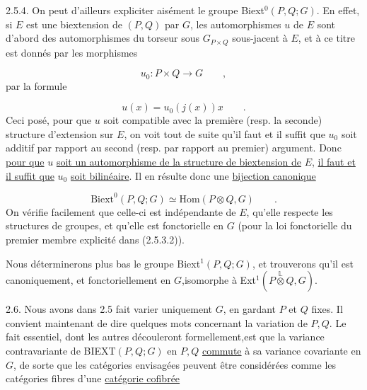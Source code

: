 
2.5.4. On peut d'ailleurs expliciter aisément le groupe Biext$^{0}(P,Q;G)$. En effet, si $E$ est une biextension de $(P,Q)$ par $G$, les automorphismes $u$ de $E$ sont d'abord des automorphismes du torseur sous $G_{P\times Q}$ sous-jacent à $E$, et à ce titre est donnés par les morphismes

\begin{equation*}
u_{0} : P\times Q \longrightarrow G \qquad ,
\end{equation*}
par la formule

\begin{equation*}
u(x) = u_{0}(j(x))x \qquad .
\end{equation*}
Ceci posé, pour que $u$ soit compatible avec la première (resp. la seconde) structure d'extension sur $E$, on voit tout de suite qu'il faut et il suffit que $u_{0}$ soit additif par rapport au second (resp. par rapport au premier) argument. Donc \underline{pour que} $u$ \underline{soit un automorphisme de la structure de biextension de} $E$, \underline{il faut et il suffit que} $u_{0}$ \underline{soit bilinéaire}. Il en résulte donc une \underline{bijection canonique}

\begin{equation}\tag{2.5.4.1}
\mathrm{Biext}^{0}(P,Q;G) \simeq \mathrm{Hom}(P\otimes Q,G) \qquad .
\end{equation}
On vérifie facilement que celle-ci est indépendante de $E$, qu'elle respecte les structures de groupes, et qu'elle est fonctorielle en $G$ (pour la loi fonctorielle du premier membre explicité dans (2.5.3.2)).

Nous déterminerons plus bas le groupe Biext$^{1}(P,Q;G)$, et trouverons qu'il est canoniquement, et fonctoriellement en $G$,isomorphe à Ext$^{1}(P \overset{\mathbb{L}}{\otimes} Q, G)$.

2.6. Nous avons dans 2.5 fait varier uniquement $G$, en gardant $P$ et $Q$ fixes. Il convient maintenant de dire quelques mots concernant la variation de $P,Q$. Le fait essentiel, dont les autres découleront formellement,est que la variance contravariante de BIEXT$(P,Q;G)$ en $P,Q$ \underline{commute} à sa variance covariante en $G$, de sorte que les catégories envisagées peuvent être considérées
comme les catégories fibres d'une \underline{catégorie cofibrée}

